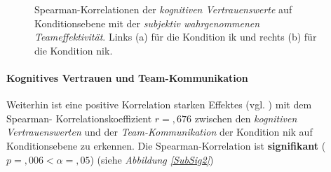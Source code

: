 \documentclass[a4paper,11pt]{article}%
\renewcommand{\\}{\vspace*{0.5\baselineskip} \newline}
\begin{document}
{\begin{figure}[h]
  \centering
  \qquad
  \caption[Spearman-Korrelation kog. Vert. NIK und wahrg. Teameffektivität NIK]{Spearman-Korrelationen der \textit{kognitiven Vertrauenswerte} auf Konditionsebene mit der \textit{subjektiv wahrgenommenen Teameffektivität}. Links (a) für die Kondition \ac{ik} und rechts (b) für die Kondition \ac{nik}.}
  \label{SubSig1}
\end{figure}

\paragraph{Kognitives Vertrauen und  Team-Kommunikation}

Weiterhin ist eine positive Korrelation starken Effektes (vgl. \citep{cohen2013statistical}) mit dem Spearman- Korrelationskoeffizient $r =,676$ zwischen den \textit{kognitiven Vertrauenswerten} und der \textit{Team-Kommunikation} der Kondition \ac{nik} auf Konditionsebene zu erkennen. Die Spearman-Korrelation ist \textbf{signifikant} ($p =,006 < \alpha = ,05$) (siehe \textit{Abbildung \ref{SubSig2}})\\

}
\end{document}
